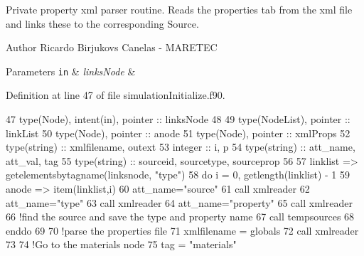 Private property xml parser routine. Reads the properties tab from the xml file and links these to the corresponding Source. 

\begin{DoxyAuthor}{Author}
Ricardo Birjukovs Canelas -\/ M\+A\+R\+E\+T\+EC 
\end{DoxyAuthor}

\begin{DoxyParams}[1]{Parameters}
\mbox{\tt in}  & {\em links\+Node} & \\
\hline
\end{DoxyParams}


Definition at line 47 of file simulation\+Initialize.\+f90.


\begin{DoxyCode}
47     \textcolor{keywordtype}{type}(Node), \textcolor{keywordtype}{intent(in)}, \textcolor{keywordtype}{pointer} :: linksNode
48 
49     \textcolor{keywordtype}{type}(NodeList), \textcolor{keywordtype}{pointer} :: linkList
50     \textcolor{keywordtype}{type}(Node), \textcolor{keywordtype}{pointer} :: anode
51     \textcolor{keywordtype}{type}(Node), \textcolor{keywordtype}{pointer} :: xmlProps
52     \textcolor{keywordtype}{type}(string) :: xmlfilename, outext
53     \textcolor{keywordtype}{integer} :: i, p
54     \textcolor{keywordtype}{type}(string) :: att\_name, att\_val, tag
55     \textcolor{keywordtype}{type}(string) :: sourceid, sourcetype, sourceprop
56 
57     linklist => getelementsbytagname(linksnode, \textcolor{stringliteral}{"type"})
58     \textcolor{keywordflow}{do} i = 0, getlength(linklist) - 1
59         anode => item(linklist,i)
60         att\_name=\textcolor{stringliteral}{"source"}
61         \textcolor{keyword}{call }xmlreader%
62         att\_name=\textcolor{stringliteral}{"type"}
63         \textcolor{keyword}{call }xmlreader%
64         att\_name=\textcolor{stringliteral}{"property"}
65         \textcolor{keyword}{call }xmlreader%
66         \textcolor{comment}{!find the source and save the type and property name}
67         \textcolor{keyword}{call }tempsources%
68 \textcolor{keywordflow}{    enddo}
69 
70     \textcolor{comment}{!parse the properties file}
71     xmlfilename = globals%
72     \textcolor{keyword}{call }xmlreader%
73 
74     \textcolor{comment}{!Go to the materials node}
75     tag = \textcolor{stringliteral}{"materials"}

\end{DoxyCode}
